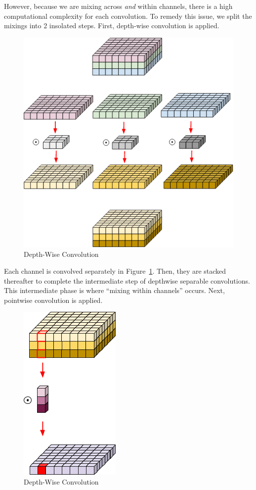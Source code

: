 \documentclass[conference]{IEEEtran}
\begin{document}
However, because we are mixing across \textit{and} within channels, there is a
high computational complexity for each convolution. To remedy this issue, we
split the mixings into 2 insolated steps.  First, depth-wise convolution is applied.

\begin{figure}[H]
    \centering
    \includegraphics[height=50ex]{./figures/depthWiseConvolution.png}
    \caption{Depth-Wise Convolution~\cite{depthWiseConvolutionImages}}%
    \label{fig:depthWiseConvolution}
\end{figure}

Each channel is convolved separately in Figure~\ref{fig:depthWiseConvolution}.
Then, they are stacked thereafter to complete the intermediate step of depthwise
separable convolutions. This intermediate phase is where ``mixing within
channels'' occurs. Next, pointwise convolution is applied.


\begin{figure}[H]
    \centering
    \includegraphics[height=50ex]{./figures/depthWiseSeparableConvolution.png}
    \caption{Depth-Wise Convolution~\cite{depthWiseConvolutionImages}}%
    \label{fig:depthWiseSeparableConvolution}
\end{figure}
\end{document}
